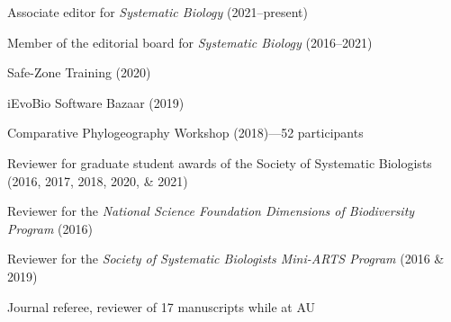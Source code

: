 \begin{veryTightItemize}
    \item Associate editor for \emph{Systematic Biology}
        (2021--present)
    \item Member of the editorial board for \emph{Systematic Biology}
        (2016--2021)
    \item Safe-Zone Training (2020)
    \item iEvoBio Software Bazaar (2019)
    \item Comparative Phylogeography Workshop (2018)---52 participants
    \item Reviewer for graduate student awards of the Society of Systematic
        Biologists (2016, 2017, 2018, 2020, \& 2021)
    \item Reviewer for the \emph{National Science Foundation Dimensions of
            Biodiversity Program} (2016)
    \item Reviewer for the \emph{Society of Systematic Biologists Mini-ARTS
            Program} (2016 \& 2019)
    \item Journal referee, reviewer of 17 manuscripts while at AU
\end{veryTightItemize}
